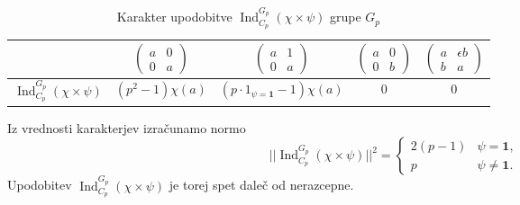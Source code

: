 \documentclass[11pt]{book}
\def\11{\mathbf{1}}
\DeclareMathOperator\Ind{Ind}
\theoremstyle{definition}
\theoremstyle{zgled}
\theoremstyle{odprtproblem}
\theoremstyle{domacanaloga}
\theoremstyle{izrek}
\begin{document}
\begin{table}[ht]
    \centering
\begin{tabular}{l|*{4}{c}}
    & 
    $\begin{pmatrix}
        a & 0 \\ 0 & a
    \end{pmatrix}$
    &
    $\begin{pmatrix}
        a & 1 \\ 0 & a
    \end{pmatrix}$
    &
    $\begin{pmatrix}
        a & 0 \\ 0 & b
    \end{pmatrix}$
    &
    $\begin{pmatrix}
        a & \epsilon b \\ b & a
    \end{pmatrix}$ \\ \hline
    $\Ind_{C_p}^{G_p}(\chi \times \psi)$ & $(p^2 - 1) \chi(a)$ & $(p \cdot 1_{\psi = \11} - 1) \chi(a)$ & $0$ & $0$ \\
\end{tabular}
\caption{Karakter upodobitve $\Ind_{C_p}^{G_p}(\chi \times \psi)$ grupe $G_p$}
\end{table}

Iz vrednosti karakterjev izračunamo normo 
\[
    ||{\textstyle \Ind_{C_p}^{G_p}(\chi \times \psi)} ||^2
    = \begin{cases}
        2(p-1) & \psi = \11, \\
        p & \psi \neq \11.
    \end{cases}
\]
Upodobitev $\Ind_{C_p}^{G_p}(\chi \times \psi)$ je torej spet daleč od nerazcepne.
\end{document}
